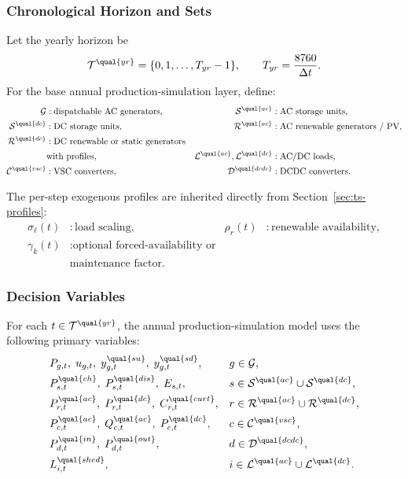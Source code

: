 \subsubsection{Chronological Horizon and Sets}

Let the yearly horizon be
\begin{align}
\mathcal{T}^{\qual{yr}} = \{0,1,\dots,T_{yr}-1\},
\qquad T_{yr} = \frac{8760}{\Delta t}.
\end{align}
For the base annual production-simulation layer, define:
\begin{align}
\mathcal{G} &: \text{dispatchable AC generators}, &
\mathcal{S}^{\qual{ac}} &: \text{AC storage units}, \\
\mathcal{S}^{\qual{dc}} &: \text{DC storage units}, &
\mathcal{R}^{\qual{ac}} &: \text{AC renewable generators / PV}, \\
\mathcal{R}^{\qual{dc}} &: \text{DC renewable or static generators} \\
& \text{with profiles}, &
\mathcal{L}^{\qual{ac}},\mathcal{L}^{\qual{dc}} &: \text{AC/DC loads}, \\
\mathcal{C}^{\qual{vsc}} &: \text{VSC converters}, &
\mathcal{D}^{\qual{dcdc}} &: \text{DCDC converters}.
\end{align}

The per-step exogenous profiles are inherited directly from
Section~\ref{sec:ts-profiles}:
\begin{align}
\sigma_\ell(t) &: \text{load scaling}, &
\rho_r(t) &: \text{renewable availability}, \\
\gamma_k(t) &: \text{optional forced-availability or} \\
& \text{maintenance factor}.
\end{align}

\subsubsection{Decision Variables}

For each \(t\in\mathcal{T}^{\qual{yr}}\), the annual production-simulation model
uses the following primary variables:
\begin{align}
&P_{g,t},\; u_{g,t},\; y_{g,t}^{\qual{su}},\; y_{g,t}^{\qual{sd}}, && g\in\mathcal{G}, \\
&P_{s,t}^{\qual{ch}},\; P_{s,t}^{\qual{dis}},\; E_{s,t}, && s\in\mathcal{S}^{\qual{ac}}\cup\mathcal{S}^{\qual{dc}}, \\
&P_{r,t}^{\qual{ac}},\; P_{r,t}^{\qual{dc}},\; C_{r,t}^{\qual{curt}}, && r\in\mathcal{R}^{\qual{ac}}\cup\mathcal{R}^{\qual{dc}}, \\
&P_{c,t}^{\qual{ac}},\; Q_{c,t}^{\qual{ac}},\; P_{c,t}^{\qual{dc}}, && c\in\mathcal{C}^{\qual{vsc}}, \\
&P_{d,t}^{\qual{in}},\; P_{d,t}^{\qual{out}}, && d\in\mathcal{D}^{\qual{dcdc}}, \\
&L_{i,t}^{\qual{shed}}, && i\in\mathcal{L}^{\qual{ac}}\cup\mathcal{L}^{\qual{dc}}.
\end{align}

